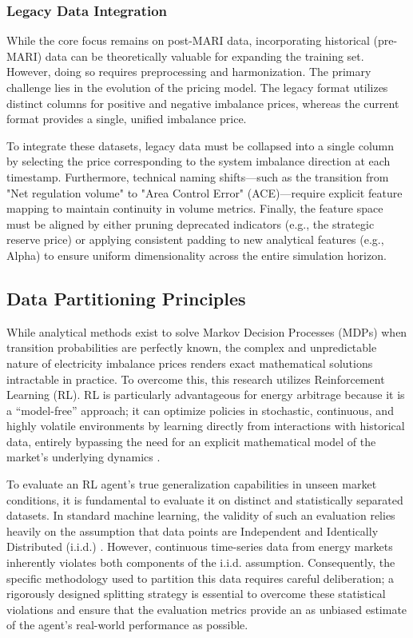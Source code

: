 \subsubsection{Legacy Data Integration}
While the core focus remains on post-MARI data, incorporating historical (pre-MARI) data can be theoretically valuable for expanding the training set. However, doing so requires preprocessing and harmonization. The primary challenge lies in the evolution of the pricing model. The legacy format utilizes distinct columns for positive and negative imbalance prices, whereas the current format provides a single, unified imbalance price. 

To integrate these datasets, legacy data must be collapsed into a single column by selecting the price corresponding to the system imbalance direction at each timestamp. Furthermore, technical naming shifts—such as the transition from "Net regulation volume" to "Area Control Error" (ACE)—require explicit feature mapping to maintain continuity in volume metrics. Finally, the feature space must be aligned by either pruning deprecated indicators (e.g., the strategic reserve price) or applying consistent padding to new analytical features (e.g., Alpha) to ensure uniform dimensionality across the entire simulation horizon.


\subsection{Data Partitioning Principles}
While analytical methods exist to solve Markov Decision Processes (MDPs) when transition probabilities are perfectly known, the complex and unpredictable nature of electricity imbalance prices renders exact mathematical solutions intractable in practice. To overcome this, this research utilizes Reinforcement Learning (RL). RL is particularly advantageous for energy arbitrage because it is a ``model-free'' approach; it can optimize policies in stochastic, continuous, and highly volatile environments by learning directly from interactions with historical data, entirely bypassing the need for an explicit mathematical model of the market's underlying dynamics \cite{VAZQUEZCANTELI20191072}. 

To evaluate an RL agent's true generalization capabilities in unseen market conditions, it is fundamental to evaluate it on distinct and statistically separated datasets. In standard machine learning, the validity of such an evaluation relies heavily on the assumption that data points are Independent and Identically Distributed (i.i.d.) \cite{pmlr-v119-hsieh20a}. However, continuous time-series data from energy markets inherently violates both components of the i.i.d. assumption. Consequently, the specific methodology used to partition this data requires careful deliberation; a rigorously designed splitting strategy is essential to overcome these statistical violations and ensure that the evaluation metrics provide an as unbiased estimate of the agent's real-world performance as possible.

